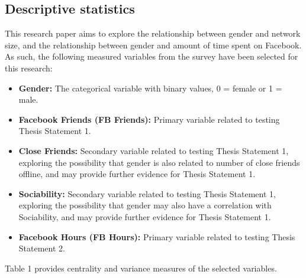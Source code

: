 
\subsection{Descriptive statistics}

This research paper aims to explore the relationship between gender and network size, and the relationship between gender and amount of time spent on Facebook. As such, the following measured variables from the survey have been selected for this research:\\

\begin{itemize}
\item \textbf{Gender:} The categorical variable with binary values, 0 = female or 1 = male.
\item \textbf{Facebook Friends (FB Friends):} Primary variable related to testing Thesis Statement 1.
\item \textbf{Close Friends:} Secondary variable related to testing Thesis Statement 1, exploring the possibility that gender is also related to number of close friends offline, and may provide further evidence for Thesis Statement 1.
\item \textbf{Sociability:} Secondary variable related to testing Thesis Statement 1, exploring the possibility that gender may also have a correlation with Sociability, and may provide further evidence for Thesis Statement 1.
\item \textbf{Facebook Hours (FB Hours):} Primary variable related to testing Thesis Statement 2.
\end{itemize}

Table 1 provides centrality and variance measures of the selected variables.\\

